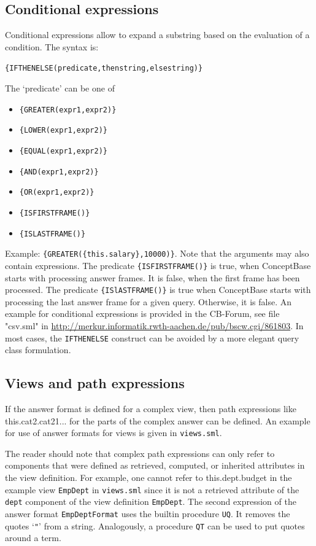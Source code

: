 \subsection{Conditional expressions}

Conditional expressions allow to expand a substring based on the evaluation of a condition. The syntax is:

\verb+{IFTHENELSE(predicate,thenstring,elsestring)}+

The `predicate' can be one of
\begin{itemize}
\item \verb+{GREATER(expr1,expr2)}+
\item \verb+{LOWER(expr1,expr2)}+
\item \verb+{EQUAL(expr1,expr2)}+
\item \verb+{AND(expr1,expr2)}+
\item \verb+{OR(expr1,expr2)}+
\item \verb+{ISFIRSTFRAME()}+
\item \verb+{ISLASTFRAME()}+
\end{itemize}

Example: \verb+{GREATER({this.salary},10000)}+.
Note that the arguments may also contain expressions.
The predicate \verb+{ISFIRSTFRAME()}+ is true, when ConceptBase starts with processing
answer frames. It is false, when the first frame has been processed. The predicate \verb+{ISlASTFRAME()}+
is true when ConceptBase starts with processing the last answer frame for a given query. Otherwise,
it is false.
An example for conditional expressions is provided in the CB-Forum, see
file "csv.sml" in \url{http://merkur.informatik.rwth-aachen.de/pub/bscw.cgi/861803}.
In most cases, the {\tt IFTHENELSE} construct can be avoided by a more elegant query class
formulation.



\subsection{Views and path expressions}

If the answer format is defined for a complex view, then path expressions like {this.cat2.cat21...} for the parts of the complex answer can be
defined.
An example for use of answer formats for views is given in {\tt views.sml}.

The reader should note that complex path expressions can only refer to components that were defined as retrieved, computed, or inherited
attributes in the view definition. For example, one cannot refer to {this.dept.budget} in the example view {\tt EmpDept} in {\tt views.sml}
since it is not a retrieved attribute of the
{\tt dept} component of the view definition {\tt EmpDept}. The second expression of the answer format {\tt EmpDeptFormat}
uses the builtin procedure {\tt UQ}. It removes the quotes `\verb+"+' from a
string. Analogously, a procedure {\tt QT} can be used to put quotes around a term.


